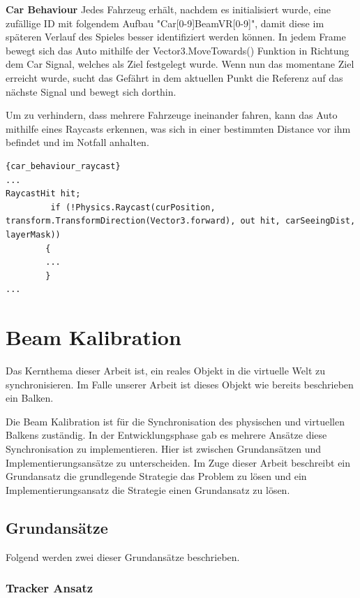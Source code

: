 \textbf{Car Behaviour}
Jedes Fahrzeug erh\"alt, nachdem es initialisiert wurde, eine zufällige ID mit folgendem Aufbau "Car[0-9]BeamVR[0-9]", damit diese im sp\"ateren Verlauf des Spieles besser identifiziert werden können.
In jedem Frame bewegt sich das Auto mithilfe der Vector3.MoveTowards() Funktion in Richtung dem Car Signal, welches als Ziel festgelegt wurde.
Wenn nun das momentane Ziel erreicht wurde, sucht das Gefährt in dem aktuellen Punkt die Referenz auf das nächste Signal und bewegt sich dorthin.

Um zu verhindern, dass mehrere Fahrzeuge ineinander fahren, kann das Auto mithilfe eines Raycasts erkennen, was sich in einer bestimmten Distance vor ihm befindet und im Notfall anhalten.

\begin{lstlisting}{car_behaviour_raycast}
...
RaycastHit hit;
         if (!Physics.Raycast(curPosition, transform.TransformDirection(Vector3.forward), out hit, carSeeingDist, layerMask))
        {
        ...
        }
...
\end{lstlisting}

\section{Beam Kalibration}
\label{sec:beam-calibration}

Das Kernthema dieser Arbeit ist, ein reales Objekt in die virtuelle Welt zu synchronisieren.
Im Falle unserer Arbeit ist dieses Objekt wie bereits beschrieben ein Balken.

Die Beam Kalibration ist für die Synchronisation des physischen und virtuellen Balkens zuständig.
In der Entwicklungsphase gab es mehrere Ansätze diese Synchronisation zu implementieren.
Hier ist zwischen Grundansätzen und Implementierungsansätze zu unterscheiden.
Im Zuge dieser Arbeit beschreibt ein Grundansatz die grundlegende Strategie das Problem zu lösen und ein Implementierungsansatz die Strategie einen Grundansatz zu lösen.

\subsection{Grundansätze}\label{subsec:grundansaetze}

Folgend werden zwei dieser Grundansätze beschrieben.

\subsubsection{Tracker Ansatz}


